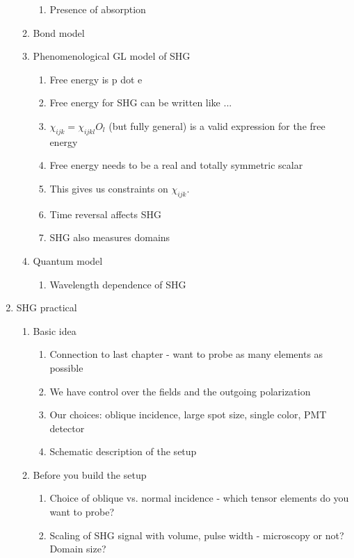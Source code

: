 \documentclass{article}
\begin{document}
\begin{enumerate}
\begin{enumerate}
\begin{enumerate}
        \item Presence of absorption
        \end{enumerate}
    \item Bond model
    \item Phenomenological GL model of SHG
        \begin{enumerate}
        \item Free energy is p dot e
        \item Free energy for SHG can be written like ...
        \item $\chi_{ijk} = \chi_{ijkl} O_l$ (but fully general) is a valid expression for the free energy
        \item Free energy needs to be a real and totally symmetric scalar
        \item This gives us constraints on $\chi_{ijk}$.
        \item Time reversal affects SHG
        \item SHG also measures domains
        \end{enumerate}
    \item Quantum model
        \begin{enumerate}
        \item Wavelength dependence of SHG
        \end{enumerate}
    \end{enumerate}
\item SHG practical
    \begin{enumerate}
    \item Basic idea
        \begin{enumerate}
        \item Connection to last chapter - want to probe as many elements as possible
        \item We have control over the fields and the outgoing polarization
        \item Our choices: oblique incidence, large spot size, single color, PMT detector
        \item Schematic description of the setup
        \end{enumerate}
    \item Before you build the setup
        \begin{enumerate}
        \item Choice of oblique vs. normal incidence - which tensor elements do you want to probe?
        \item Scaling of SHG signal with volume, pulse width - microscopy or not? Domain size?

\end{enumerate}
\end{enumerate}
\end{enumerate}
\end{document}
